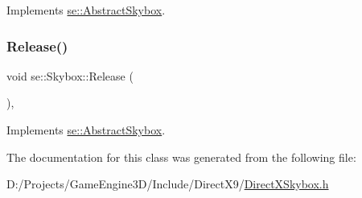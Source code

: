 Implements \mbox{\hyperlink{classse_1_1_abstract_skybox_a652add712c92f3d7ebe7f82dc353fa1c}{se\+::\+Abstract\+Skybox}}.

\mbox{\label{classse_1_1_skybox_ad9a6b80274236240aba6eaafaf7d2e9c}} 
\subsubsection{\texorpdfstring{Release()}{Release()}}
{\footnotesize\ttfamily void se\+::\+Skybox\+::\+Release (\begin{DoxyParamCaption}{ }\end{DoxyParamCaption})\hspace{0.3cm}{\ttfamily [override]}, {\ttfamily [virtual]}}



Implements \mbox{\hyperlink{classse_1_1_abstract_skybox_a5aa158b7db1140ffc5c696347f32e2ef}{se\+::\+Abstract\+Skybox}}.



The documentation for this class was generated from the following file\+:\begin{DoxyCompactItemize}
\item 
D\+:/\+Projects/\+Game\+Engine3\+D/\+Include/\+Direct\+X9/\mbox{\hyperlink{_direct_x_skybox_8h}{Direct\+X\+Skybox.\+h}}\end{DoxyCompactItemize}

